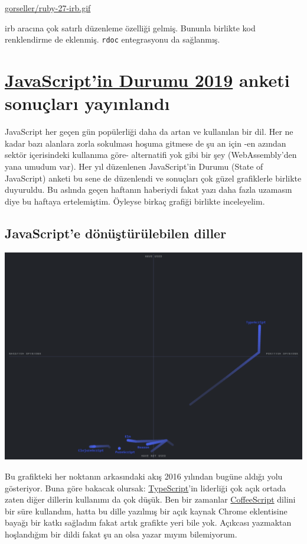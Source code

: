 \documentclass[11pt]{article}
\begin{document}
\url{gorseller/ruby-27-irb.gif}

irb aracına çok satırlı düzenleme özelliği gelmiş. Bununla birlikte kod
renklendirme de eklenmiş. \texttt{rdoc} entegrasyonu da sağlanmış.
\section{\href{https://2019.stateofjs.com/}{JavaScript'in Durumu 2019} anketi sonuçları yayınlandı}
\label{sec:orgaa2f0a8}
JavaScript her geçen gün popülerliği daha da artan ve kullanılan bir dil. Her
ne kadar bazı alanlara zorla sokulması hoşuma gitmese de şu an için -en azından
sektör içerisindeki kullanıma göre- alternatifi yok gibi bir şey
(WebAssembly'den yana umudum var). Her yıl düzenlenen JavaScript'in Durumu
(State of JavaScript) anketi bu sene de düzenlendi ve sonuçları çok güzel
grafiklerle birlikte duyuruldu. Bu aslında geçen haftanın haberiydi fakat yazı
daha fazla uzamasın diye bu haftaya ertelemiştim. Öyleyse birkaç grafiği
birlikte inceleyelim.

\subsection{JavaScript'e dönüştürülebilen diller}
\label{sec:orgc8ff263}
\begin{center}
\includegraphics[width=.9\linewidth]{gorseller/sojs-javascript-flavors.png}
\end{center}

Bu grafikteki her noktanın arkasındaki akış 2016 yılından bugüne aldığı yolu
gösteriyor. Buna göre bakacak olursak: \href{https://www.typescriptlang.org/}{TypeScript}'in liderliği çok açık
ortada zaten diğer dillerin kullanımı da çok düşük. Ben bir zamanlar
\href{https://coffeescript.org/}{CoffeeScript} dilini bir süre kullandım, hatta bu dille yazılmış bir açık
kaynak Chrome eklentisine bayağı bir katkı sağladım fakat artık grafikte yeri
bile yok. Açıkcası yazmaktan hoşlandığım bir dildi fakat şu an olsa yazar
mıyım bilemiyorum.
\end{document}
